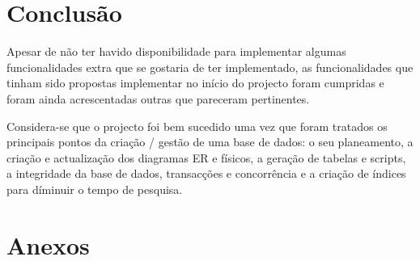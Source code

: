 \documentclass[a4paper, 12pt]{article}
\begin{document}
\section{Conclusão}
\indent \indent Apesar de não ter havido disponibilidade para implementar algumas funcionalidades extra que se gostaria de ter implementado, as funcionalidades que tinham sido propostas implementar no início do projecto foram cumpridas e foram ainda acrescentadas outras que pareceram pertinentes.

Considera-se que o projecto foi bem sucedido uma vez que foram tratados os principais pontos da criação / gestão de uma base de dados: o seu planeamento, a criação e actualização dos diagramas ER e físicos, a geração de tabelas e scripts, a integridade da base de dados, transacções e concorrência e a criação de índices para díminuir o tempo de pesquisa.
\cleardoublepage

\section{Anexos}
\end{document}
